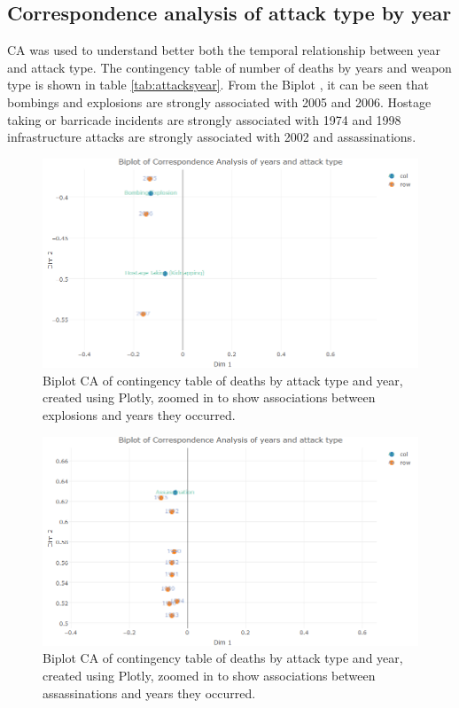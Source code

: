 \subsection{Correspondence analysis of attack type by year}\label{viewing-deaths-by-attack-vector-type-CA}

CA was used to understand better both the  temporal relationship between year and attack type. The contingency table of number of deaths by years and weapon type is shown in table \ref{tab:attacksyear}. From the Biplot , it can be seen that bombings and explosions are strongly associated with 2005 and 2006. Hostage taking or barricade incidents are strongly associated with 1974 and 1998 infrastructure attacks are strongly associated with 2002 and assassinations.

\begin{figure}[t]
\includegraphics[width=15cm]{Peters_experiment_markdown_files/figure-latex/biplotexlosions.png}
\caption{Biplot CA of contingency table of deaths by attack type and year, created using Plotly, zoomed in to show associations between explosions  and years they occurred.}
\label{fig:biplotattacktypeca1}
\centering
\end{figure}
\begin{figure}[t]
\includegraphics[width=15cm]{Peters_experiment_markdown_files/figure-latex/assassinationbiplot.png}
\caption{Biplot CA of contingency table of deaths by attack type and year, created using Plotly, zoomed in to show associations between assassinations and years they occurred.}
\label{fig:biplotattacktypeca2}
\centering
\end{figure}

